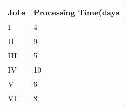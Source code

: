 \begin{tabular}{|l|l|}
\hline
\multicolumn{1}{|c|}{\textbf{Jobs}}    & \multicolumn{1}{|c|}{\textbf{Processing Time(days}} \\
\hline
I   &4\\
\hline
II &9\\
\hline
III &5\\
\hline
IV &10\\
\hline
V &6\\
\hline
VI &8\\
\hline
\end{tabular}